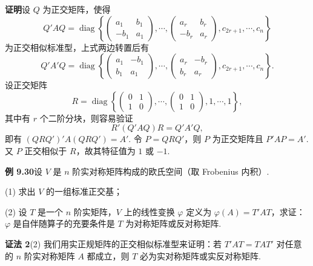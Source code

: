 \documentclass[UTF8, 12pt, fontset=fandol, oneside]{ctexart}
\begin{document}
\noindent\textbf{证明}\quad 设 $Q$ 为正交矩阵，使得
\[
Q'AQ=\operatorname{diag}\left\{
\begin{pmatrix}
a_1&b_1\\
-b_1&a_1
\end{pmatrix},\cdots,
\begin{pmatrix}
a_r&b_r\\
-b_r&a_r
\end{pmatrix},
c_{2r+1},\cdots,c_n
\right\}
\]
为正交相似标准型，上式两边转置后有
\[
Q'A'Q=\operatorname{diag}\left\{
\begin{pmatrix}
a_1&-b_1\\
b_1&a_1
\end{pmatrix},\cdots,
\begin{pmatrix}
a_r&-b_r\\
b_r&a_r
\end{pmatrix},
c_{2r+1},\cdots,c_n
\right\}.
\]
设正交矩阵
\[
R=\operatorname{diag}\left\{
\begin{pmatrix}
0&1\\
1&0
\end{pmatrix},\cdots,
\begin{pmatrix}
0&1\\
1&0
\end{pmatrix},
1,\cdots,1
\right\},
\]
其中有 $r$ 个二阶分块，则容易验证
\[
R'(Q'AQ)R=Q'A'Q,
\]
即有 $(QRQ')'A(QRQ')=A'$. 令 $P=QRQ'$，则 $P$ 为正交矩阵且 $P'AP=A'$. 又 $P$ 正交相似于 $R$，故其特征值为 $1$ 或 $-1$.

\noindent\textbf{例 9.30}\quad 设 $V$ 是 $n$ 阶实对称矩阵构成的欧氏空间（取 Frobenius 内积）.

(1) 求出 $V$ 的一组标准正交基；

(2) 设 $T$ 是一个 $n$ 阶实矩阵，$V$ 上的线性变换 $\varphi$ 定义为 $\varphi(A)=T'AT$，求证：$\varphi$ 是自伴随算子的充要条件是 $T$ 为对称矩阵或反对称矩阵.

\noindent\textbf{证法 2}\quad (2) 我们用实正规矩阵的正交相似标准型来证明：若 $T'AT=TA T'$ 对任意的 $n$ 阶实对称矩阵 $A$ 都成立，则 $T$ 必为实对称矩阵或实反对称矩阵.
\end{document}
